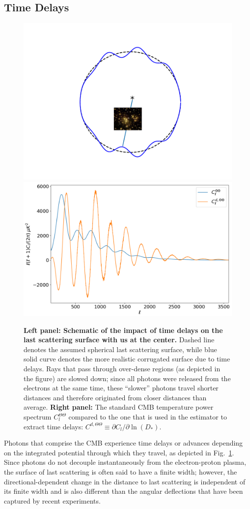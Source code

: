 \subsection{Time Delays}

\begin{figure}
  \begin{center}
    \includegraphics[width=0.25\columnwidth]{td.pdf}
    \hspace{1cm}
    \includegraphics[width=0.4\columnwidth]{TT1}
  \end{center}
  \caption{ \footnotesize
\label{tdf} {\bf Left panel: Schematic of the impact of time
  delays on the last scattering surface with us at the center.} Dashed
  line denotes the assumed spherical last scattering surface, while
  blue solid curve denotes the more realistic corrugated surface due
  to time delays. Rays that pass through over-dense regions (as
  depicted in the figure) are slowed down; since all photons were
  released from the electrons at the same time, these ``slower''
  photons travel shorter distances and therefore originated from
  closer distances than average.
{\bf Right panel:} The standard CMB temperature
  power spectrum $C_l^{\Theta\Theta}$ compared to the one that is used
  in the estimator to extract time delays: $C^{d,\Theta\Theta}\equiv
  \partial C_l/\partial \ln(D_*)$.
}
\end{figure}




Photons that comprise the CMB experience time delays or advances
depending on the integrated potential through which they travel, as
depicted in Fig.~\ref{tdf}. Since photons do not decouple
instantaneously from the electron-proton plasma, the surface of last
scattering is often said to have a finite width; however, the
directional-dependent change in the distance to last scattering is
independent of its finite width and is also different than the angular
deflections that have been captured by recent experiments.

